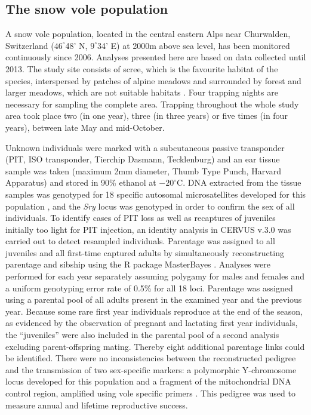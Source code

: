 \subsection{The snow vole population}\label{ap:snv}
A snow vole population, located in the central eastern Alps near Churwalden, Switzerland ($46^{\circ}$48' N, $9^{\circ}$34' E) at 2000m above sea level, has been monitored continuously since 2006. Analyses presented here are based on data collected until 2013. The study site consists of scree, which is the favourite habitat of the species, interspersed by patches of alpine meadows and surrounded by forest and larger meadows, which are not suitable habitats \parencite{Janeau1997}. Four trapping nights are necessary for sampling the complete area. Trapping throughout the whole study area took place two (in one year), three (in three years) or five times (in four years), between late May and mid-October. 

Unknown individuals were marked with a subcutaneous passive transponder (PIT, ISO transponder, Tierchip Dasmann, Tecklenburg) and an ear tissue sample was taken (maximum 2mm diameter, Thumb Type Punch, Harvard Apparatus) and stored in 90\% ethanol at $-20^{\circ}\mathrm{C}$. DNA extracted from the tissue samples was genotyped for 18 specific autosomal microsatellites developed for this population \parencite{Wandeler2008}, and the \textit{Sry} locus was genotyped in order to confirm the sex of all individuals. To identify cases of PIT loss as well as recaptures of juveniles initially too light for PIT injection, an identity analysis in CERVUS v.3.0 \parencite{Marshall1998} was carried out to detect resampled individuals.
Parentage was assigned to all juveniles and all first-time captured adults by simultaneously reconstructing parentage and sibship using the R package MasterBayes \parencite{Hadfield2006}. Analyses were performed for each year separately assuming polygamy for males and females and a uniform genotyping error rate of 0.5\% for all 18 loci. Parentage was assigned using a parental pool of all adults present in the examined year and the previous year. Because some rare first year individuals reproduce at the end of the season, as evidenced by the observation of pregnant and lactating first year individuals, the ``juveniles'' were also included in the parental pool of a second analysis excluding parent-offspring mating. Thereby eight additional parentage links could be identified. There were no inconsistencies between the reconstructed pedigree and the transmission of two sex-specific markers: a polymorphic Y-chromosome locus developed for this population \parencite{Wandeler2011} and a fragment of the mitochondrial DNA control region, amplified using vole specific primers \parencite{Haring2000}. This pedigree was used to measure annual and lifetime reproductive success.

